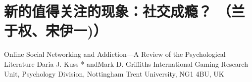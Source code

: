 \section{新的值得关注的现象：社交成瘾？  %
（兰于权、宋伊一)）%
}

Online Social Networking and Addiction—A Review of the Psychological Literature
Daria J. Kuss *   andMark D. Griffiths 
International Gaming Research Unit, Psychology Division, Nottingham Trent University, NG1 4BU, UK

